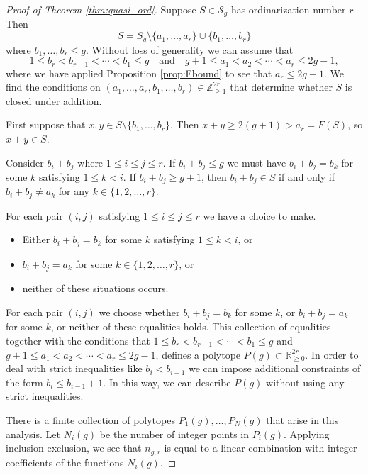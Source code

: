 \documentclass[12pt]{amsart}
\newcommand{\Z}{{\mathbb Z}}
\newcommand{\R}{{\mathbb R}}
\newcommand{\Sg}{{\mathcal S}}
\theoremstyle{plain}\newtheorem{proposition}{Proposition}[section]
\begin{document}
\begin{proof}[Proof of Theorem \ref{thm:quasi_ord}]
Suppose $S \in \Sg_g$ has ordinarization number $r$.  Then 
\[
S = S_g \setminus \{a_1,\ldots, a_r\} \cup \{b_1,\ldots, b_r\}
\] 
where $b_1,\ldots, b_r \le g$.  Without loss of generality we can assume that 
\[
1\le b_r < b_{r-1} < \cdots < b_1 \le g\ \ \ \text{ and }\ \ \  g+1 \le a_1 < a_2 < \cdots < a_r \le 2g-1,
\] 
where we have applied Proposition \ref{prop:Fbound} to see that $a_r \le 2g-1$.  We find the conditions on $(a_1,\ldots, a_r, b_1, \ldots, b_r) \in \Z_{\ge 1}^{2r}$ that determine whether $S$ is closed under addition.

First suppose that $x,y \in S \setminus \{b_1,\ldots, b_r\}$.  Then $x+y \ge 2(g+1) > a_r = F(S)$, so $x+y \in S$. 

Consider $b_i + b_j$ where $1\le i \le j \le r$.  If $b_i + b_j \le g$ we must have $b_i + b_j = b_k$ for some $k$ satisfying $1\le k < i$.   If $b_i + b_j \ge g+1$, then $b_i + b_j \in S$ if and only if $b_i + b_j \neq a_k$ for any $k \in \{1,2,\ldots, r\}$.

For each pair $(i,j)$ satisfying $1\le i \le j \le r$ we have a choice to make.  
\begin{itemize}
\item Either $b_i + b_j = b_k$ for some $k$ satisfying $1 \le k < i$, or 
\item $b_i + b_j = a_k$ for some $k \in \{1,2,\ldots, r\}$, or
\item neither of these situations occurs.
\end{itemize}
For each pair $(i,j)$ we choose whether $b_i + b_j = b_k$ for some $k$, or $b_i + b_j = a_k$ for some $k$, or neither of these equalities holds.  This collection of equalities together with the conditions that $1\le b_r < b_{r-1} < \cdots < b_1 \le g$ and $g+1 \le a_1 < a_2 < \cdots < a_r \le 2g-1$, defines a polytope $P(g) \subset \R_{\ge 0}^{2r}$.  In order to deal with strict inequalities like $b_i < b_{i-1}$ we can impose additional constraints of the form $b_i \le b_{i-1}+1$.  In this way, we can describe $P(g)$ without using any strict inequalities.

There is a finite collection of polytopes $P_1(g),\ldots, P_N(g)$ that arise in this analysis.  
Let $N_i(g)$ be the number of integer points in $P_i(g)$.  Applying inclusion-exclusion, we see that $n_{g,r}$ is equal to a linear combination with integer coefficients of the functions $N_i(g)$.


\end{proof}
\end{document}
